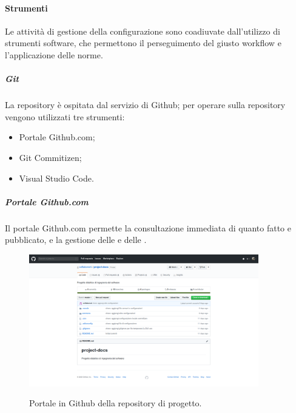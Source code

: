 \documentclass[../norme-di-progetto.tex]{subfiles}
\begin{document}
\paragraph{Strumenti}
Le attività di gestione della configurazione sono coadiuvate dall'utilizzo di strumenti software, che permettono il perseguimento del giusto workflow e l'applicazione delle norme.
\subparagraph{Git}
La repository è ospitata dal servizio di  Github; per operare sulla repository vengono utilizzati tre strumenti:
\begin{itemize}
  \item Portale Github.com;
  \item Git Commitizen;
  \item Visual Studio Code.
\end{itemize}
\subparagraph*{Portale Github.com}
Il portale Github.com permette la consultazione immediata di quanto fatto e pubblicato, e la gestione delle  e delle .
\begin{figure}[H]
  \centering
  \includegraphics[width=10cm]{img/github.png}
  \label{fig:github}
  \caption{Portale in Github della repository di progetto.}
\end{figure}
\end{document}

